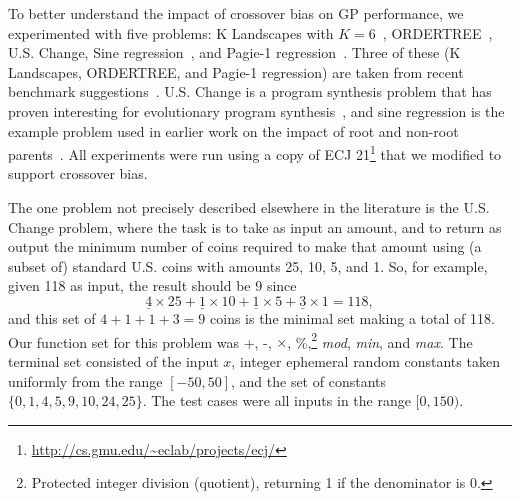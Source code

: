 \documentclass{sig-alternate}
\begin{document}
To better understand the impact of crossover bias on GP performance, we experimented with five problems: K Landscapes
with $K=6$~\cite{vanneschi2011k}, ORDER\-TREE~\cite{hoang2006ordertree}, U.S. Change, Sine
regression~\cite{poli08:fieldguide}, and Pagie-1 regression~\cite{pagie1997evolutionary}. Three of these (K Landscapes,
ORDERTREE, and Pagie-1 regression) are taken from recent benchmark suggestions~\cite{gp-benchmarks-2013}. U.S. Change
is a program synthesis problem  that has proven interesting for evolutionary program
synthesis~\cite{zhan2014quantitative}, and sine regression is the example problem used in earlier work on the impact of
root and non-root parents~\cite{McPheeDonatucciDramdahl:2014}. 
All experiments were run using a copy of ECJ 21\footnote{\url{http://cs.gmu.edu/~eclab/projects/ecj/}} that we modified
to support crossover bias.

The one problem not precisely described elsewhere in the literature is the U.S. Change problem, where the task is to
take as input an amount, and to return as output the minimum number of coins required to make that amount using (a
subset of) standard U.S. coins with amounts 25, 10, 5, and 1. So, for example, given 118 as input, the result should be
9 since 
\[
	\underline{4} \times 25 + \underline{1} \times 10 + \underline{1} \times 5 + \underline{3} \times 1 = 118,
\]
and this set of $4+1+1+3 = 9$ coins is the minimal set making a total of 118. Our function set for this problem was +,
-, $\times$, \%,\footnote{Protected integer division (quotient), returning 1 if the denominator is 0.} \emph{mod},
\emph{min}, and \emph{max}. The terminal set consisted of the input $x$, integer ephemeral random constants taken
uniformly from the range $[-50, 50]$, and the set of constants $\{ 0, 1, 4, 5, 9, 10, 24, 25 \}$. The test cases were
all inputs in the range $[0, 150)$.

\end{document}

